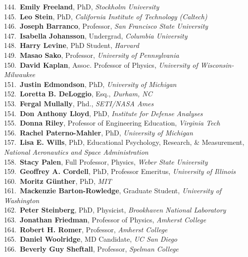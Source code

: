 144.~{\bf Emily Freeland}, PhD, {\sl Stockholm University} \\
145.~{\bf Leo Stein}, PhD, {\sl California Institute of Technology (Caltech)} \\
146.~{\bf Joseph Barranco}, Professor, {\sl San Francisco State University} \\
147.~{\bf Isabella Johansson}, Undergrad, {\sl Columbia University} \\
148.~{\bf Harry Levine}, PhD Student, {\sl Harvard} \\
149.~{\bf Masao Sako}, Professor, {\sl University of Pennsylvania} \\
150.~{\bf David Kaplan}, Assoc. Professor of Physics, {\sl University of Wisconsin-Milwaukee} \\
151.~{\bf Justin Edmondson}, PhD, {\sl University of Michigan} \\
152.~{\bf Loretta B. DeLoggio}, Esq., {\sl Durham, NC} \\
153.~{\bf Fergal Mullally}, Phd., {\sl SETI/NASA Ames} \\
154.~{\bf Don Anthony Lloyd}, PhD, {\sl Institute for Defense Analyses} \\
155.~{\bf Donna Riley}, Professor of Engineering Education, {\sl Virginia Tech} \\
156.~{\bf Rachel Paterno-Mahler}, PhD, {\sl University of Michigan} \\
157.~{\bf Lisa E. Wills}, PhD, Educational Psychology, Research,  \& Measurement, {\sl National Aeronautics and Space Administration } \\
158.~{\bf Stacy Palen}, Full Professor, Physics, {\sl Weber State University} \\
159.~{\bf Geoffrey A. Cordell}, PhD, Professor Emeritus, {\sl University of Illinois} \\
160.~{\bf Moritz Günther}, PhD, {\sl MIT} \\
161.~{\bf Mackenzie Barton-Rowledge}, Graduate Student, {\sl University of Washington} \\
162.~{\bf Peter Steinberg}, PhD, Physicist, {\sl Brookhaven National Laboratory} \\
163.~{\bf Jonathan Friedman}, Professor of Physics, {\sl Amherst College} \\
164.~{\bf Robert H. Romer}, Professor, {\sl Amherst College} \\
165.~{\bf Daniel Woolridge}, MD Candidate, {\sl UC San Diego} \\
166.~{\bf Beverly Guy Sheftall}, Professor, {\sl Spelman College} \\
